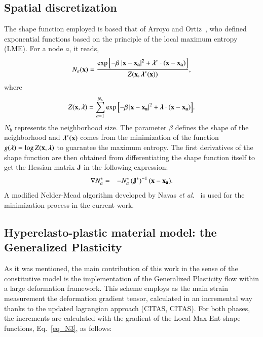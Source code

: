 \documentclass[preprint,12pt,a4paper]{elsarticle}
\begin{document}
\subsection{Spatial discretization}
\label{subsec:23}
The shape function employed is based that of Arroyo and Ortiz~\cite{arroyo2006}, who defined exponential  functions based on the principle of  the local maximum entropy (LME).  For a node $a$, it reads,
\begin{equation} \label{eq_N1}
N_a(\textbf{x})=\frac{\exp\left[ -\beta \; |\bf x-x_a|^2 +  \boldsymbol{\lambda}^*  \cdot  (x-x_a)         \right] } {Z(\textbf{x},\boldsymbol{\lambda}^*(\textbf{x}))},
\end{equation}
where
\begin{equation}\label{eq_N2}
Z({\bf x}, {\boldsymbol{\lambda}}) = \sum_{a=1}^{N_b}{ \exp \left[ -\beta \, |{\bf x-x_a}|^2 + \boldsymbol{\lambda}  \cdot  \bf {(x-x_a)}         \right]}.
\end{equation}
$N_b$ represents the neighborhood size. The parameter $\beta$ defines the shape of the neighborhood and $\boldsymbol{\lambda}^*(\bf x)$ comes from the minimization of the function $g(\boldsymbol{\lambda})=\log Z(\bf x, \boldsymbol{\lambda})$ to guarantee the maximum entropy. The first derivatives of the shape function are then obtained from differentiating the shape function itself to get the Hessian matrix \textbf{J}  in the following expression:
\begin{eqnarray}
\nabla N^*_a &=& -N^*_a \,  (\textbf{J}^*)^{-1} \,  (\bf x-x_a) \label{eq_N3}.
\end{eqnarray}
A modified Nelder-Mead algorithm developed by Navas {\it et al.}~\cite{Navas2018} is used for the minimization process in the current work.
 
\subsection{
Hyperelasto-plastic material model: the Generalized Plasticity 
}
\label{subsec:24}
As it was mentioned, the main contribution of this work in the sense of the constitutive model is the implementation of the Generalized Plasticity flow within a large deformation framework. This scheme employs as the main strain measurement the deformation gradient tensor, calculated in an incremental way thanks to the updated lagrangian approach (CITAS, CITAS). For both phases, the increments are calculated with the gradient of the Local Max-Ent shape functions, Eq.~\eqref{eq_N3}, as follows:
\end{document}
